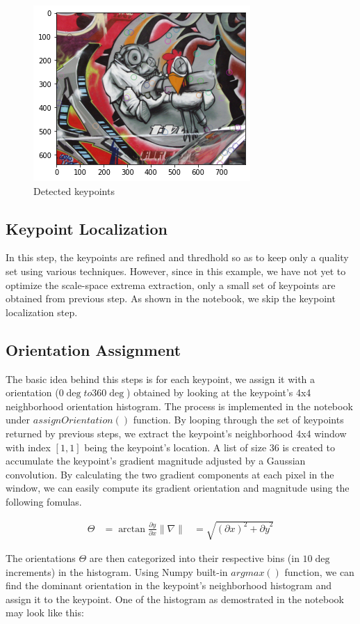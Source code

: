 \documentclass{article}
\begin{document}
\begin{multicols}{2}
	\begin{figure}
		\centering
		\includegraphics[width=0.4\linewidth]{locateKeypoints.png}
		\caption{\label{fig:locateKeypoints} Detected keypoints}
	\end{figure}
	
	\subsection{Keypoint Localization}
	In this step, the keypoints are refined and thredhold so as to keep only a quality set using various techniques. However, since in this example, we have not yet to optimize the scale-space extrema extraction, only a small set of keypoints are obtained from previous step. As shown in the notebook, we skip the keypoint localization step.
	
	\subsection{Orientation Assignment}
	The basic idea behind this steps is for each keypoint, we assign it with a orientation ($0\deg to 360\deg$) obtained by looking at the keypoint's 4x4 neighborhood orientation histogram. The process is implemented in the notebook under $assignOrientation()$ function. By looping through the set of keypoints returned by previous steps, we extract the keypoint's neighborhood 4x4 window with index $[1,1]$ being the keypoint's location. A list of size 36 is created to accumulate the keypoint's gradient magnitude adjusted by a Gaussian convolution. By calculating the two gradient components at each pixel in the window, we can easily compute its gradient orientation and magnitude using the following fomulas.
	
	\begin{align*}
		\Theta       & =\arctan{\frac{\partial y}{\partial x}} 
		\| \nabla \| & =\sqrt{(\partial x)^2 + {\partial y}^2} 
	\end{align*}
	
	The orientations $\Theta$ are then categorized into their respective bins (in $10\deg$ increments) in the histogram. Using Numpy built-in $argmax()$ function, we can find the dominant orientation in the keypoint's neighborhood histogram and assign it to the keypoint. One of the histogram as demostrated in the notebook may look like this:
	

\end{multicols}
\end{document}
